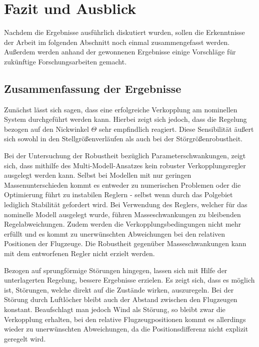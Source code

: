 \chapter{Fazit und Ausblick}\label{chap:Fazit}
Nachdem die Ergebnisse ausführlich diskutiert wurden, sollen die Erkenntnisse der Arbeit im folgenden Abschnitt noch einmal zusammengefasst werden. Außerdem werden anhand der gewonnenen Ergebnisse einige Vorschläge für zukünftige Forschungsarbeiten gemacht.

\section{Zusammenfassung der Ergebnisse}
Zunächst lässt sich sagen, dass eine erfolgreiche Verkopplung am nominellen System durchgeführt werden kann. Hierbei zeigt sich jedoch, dass die Regelung bezogen auf den Nickwinkel $\Theta$ sehr empfindlich reagiert.
Diese Sensibilität äußert sich sowohl in den Stellgrößenverläufen als auch bei der Störgrößenrobustheit.

Bei der Untersuchung der Robustheit bezüglich Parameterschwankungen, zeigt sich, dass mithilfe des Multi-Modell-Ansatzes kein robuster Verkopplungsregler ausgelegt werden kann. Selbst bei Modellen mit nur geringen Massenunterschieden kommt es entweder zu numerischen Problemen oder die Optimierung führt zu instabilen Reglern - selbst wenn durch das Polgebiet lediglich Stabilität gefordert wird. 
Bei Verwendung des Reglers, welcher für das nominelle Modell ausgelegt wurde, führen Masseschwankungen zu bleibenden Regelabweichungen. Zudem werden die Verkopplungsbedingungen nicht mehr erfüllt und es kommt zu unerwünschten Abweichungen bei den relativen Positionen der Flugzeuge.
Die Robustheit gegenüber Masseschwankungen kann mit dem entworfenen Regler nicht erzielt werden.

Bezogen auf sprungförmige Störungen hingegen, lassen sich mit Hilfe der unterlagerten Regelung, bessere Ergebnisse erzielen. Es zeigt sich, dass es möglich ist, Störungen, welche direkt auf die Zustände wirken, auszuregeln. Bei der Störung durch Luftlöcher bleibt auch der Abstand zwischen den Flugzeugen konstant.
Beaufschlagt man jedoch Wind als Störung, so bleibt zwar die Verkopplung erhalten, bei den relative Flugzeugpositionen kommt es allerdings wieder zu unerwünschten Abweichungen, da die Positionsdifferenz nicht explizit geregelt wird.

